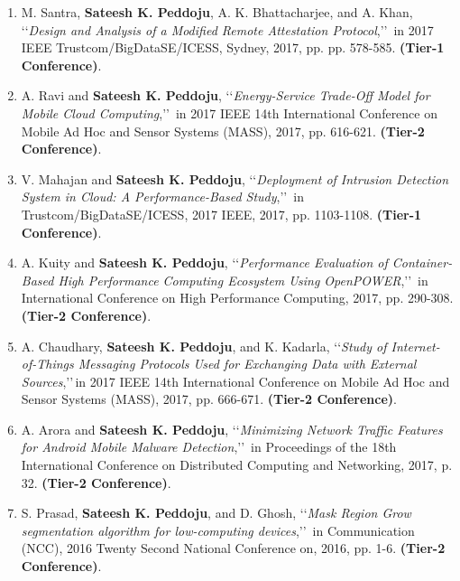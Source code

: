 \begin{enumerate}

	\item
	M. Santra, \textbf{Sateesh K. Peddoju}, A. K. Bhattacharjee, and A. Khan, \lq\lq \textit{Design and Analysis of a Modified Remote Attestation Protocol},\rq\rq\, in 2017 IEEE Trustcom/BigDataSE/ICESS, Sydney, 2017, pp. pp. 578-585. \textbf{(Tier-1 Conference)}.
	
	\item
	A. Ravi and \textbf{Sateesh K. Peddoju}, \lq\lq \textit{Energy-Service Trade-Off Model for Mobile Cloud Computing},\rq\rq\, in 2017 IEEE 14th International Conference on Mobile Ad Hoc and Sensor Systems (MASS), 2017, pp. 616-621. \textbf{(Tier-2 Conference)}.
	
	\item
	V. Mahajan and \textbf{Sateesh K. Peddoju}, \lq\lq \textit{Deployment of Intrusion Detection System in Cloud: A Performance-Based Study},\rq\rq\,  in Trustcom/BigDataSE/ICESS, 2017 IEEE, 2017, pp. 1103-1108. \textbf{(Tier-1 Conference)}.
	
	\item
	A. Kuity and \textbf{Sateesh K. Peddoju}, \lq\lq \textit{Performance Evaluation of Container-Based High Performance Computing Ecosystem Using OpenPOWER},\rq\rq\,  in International Conference on High Performance Computing, 2017, pp. 290-308. \textbf{(Tier-2 Conference)}.
	
	\item
	A. Chaudhary, \textbf{Sateesh K. Peddoju}, and K. Kadarla, \lq\lq \textit{Study of Internet-of-Things Messaging Protocols Used for Exchanging Data with External Sources},\rq\rq\,in 2017 IEEE 14th International Conference on Mobile Ad Hoc and Sensor Systems (MASS), 2017, pp. 666-671. \textbf{(Tier-2 Conference)}.
	
	\item
	A. Arora and \textbf{Sateesh K. Peddoju}, \lq\lq \textit{Minimizing Network Traffic Features for Android Mobile Malware Detection},\rq\rq\, in Proceedings of the 18th International Conference on Distributed Computing and Networking, 2017, p. 32. \textbf{(Tier-2 Conference)}.
	
	\item
	S. Prasad, \textbf{Sateesh K. Peddoju}, and D. Ghosh, \lq\lq \textit{Mask Region Grow segmentation algorithm for low-computing devices},\rq\rq\, in Communication (NCC), 2016 Twenty Second National Conference on, 2016, pp. 1-6. \textbf{(Tier-2 Conference)}.
	

\end{enumerate}
